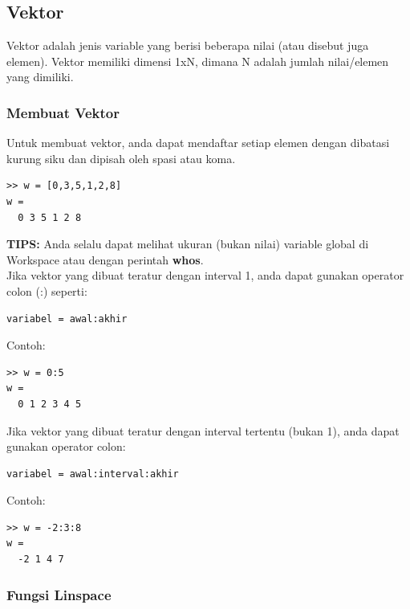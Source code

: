 \documentclass[12pt]{book}
\begin{document}
	\subsection{Vektor}

	Vektor adalah jenis variable yang berisi beberapa nilai (atau disebut juga elemen).
	Vektor memiliki dimensi 1xN, dimana N adalah jumlah nilai/elemen yang dimiliki.

	\subsubsection{Membuat Vektor}

	Untuk membuat vektor, anda dapat mendaftar setiap elemen dengan dibatasi kurung siku dan dipisah oleh spasi atau koma.
	\begin{verbatim}
>> w = [0,3,5,1,2,8]
w =
  0 3 5 1 2 8
	\end{verbatim}

	\textbf{TIPS:} Anda selalu dapat melihat ukuran (bukan nilai) variable global di Workspace atau dengan perintah \textbf{whos}.\\

	Jika vektor yang dibuat teratur dengan interval 1, anda dapat gunakan operator colon (:) seperti:
	\begin{verbatim}
variabel = awal:akhir
	\end{verbatim}

	Contoh:
	\begin{verbatim}
>> w = 0:5
w =
  0 1 2 3 4 5
	\end{verbatim}

	Jika vektor yang dibuat teratur dengan interval tertentu (bukan 1), anda dapat gunakan operator colon:
	\begin{verbatim}
variabel = awal:interval:akhir
	\end{verbatim}

	Contoh:
	\begin{verbatim}
>> w = -2:3:8
w =
  -2 1 4 7
	\end{verbatim}

	\subsubsection{Fungsi Linspace}
\end{document}
